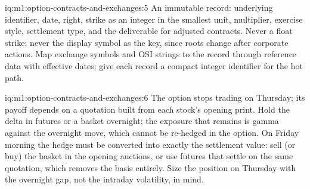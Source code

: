 \begin{solution}{iq:m1:option-contracts-and-exchanges:5}
An immutable record: underlying identifier,  date, right, strike as an
integer in the smallest unit, multiplier, exercise style, settlement type,
and the deliverable for adjusted contracts. Never a float strike; never the
display symbol as the key, since roots change after corporate actions. Map
exchange symbols and OSI strings to the record through reference data with
effective dates; give each record a compact integer identifier for the hot
path.
\end{solution}

\begin{solution}{iq:m1:option-contracts-and-exchanges:6}
The option stops trading on Thursday; its payoff depends on a quotation built
from each stock's opening print. Hold the delta in futures or a basket
overnight; the exposure that remains is gamma against the overnight move,
which cannot be re-hedged in the option. On Friday morning the hedge must
be converted into exactly the settlement value: sell (or buy) the basket in
the opening auctions, or use futures that settle on the same quotation, which
removes the basis entirely. Size the position on Thursday with the overnight
gap, not the intraday volatility, in mind.
\end{solution}
